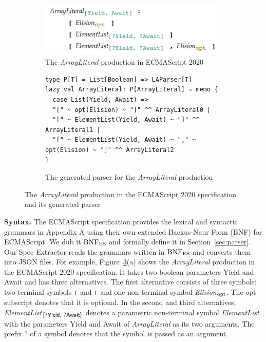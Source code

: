 \begin{figure}
  \centering
  \begin{subfigure}[t]{0.4\textwidth}
    \includegraphics[width=\textwidth]{img/array_literal.png}
    \caption{The \textit{ArrayLiteral} production in ECMAScript 2020}
    \label{fig:array-literal-es}
  \end{subfigure}
  \begin{subfigure}[t]{0.46\textwidth}
    \begin{lstlisting}[style=myScalastyle]
type P[T] = List[Boolean] => LAParser[T]
lazy val ArrayLiteral: P[ArrayLiteral] = memo {
  case List(Yield, Await) =>
  "[" ~ opt(Elision) ~ "]" ^^ ArrayLiteral0 |
  "[" ~ ElementList(Yield, Await) ~ "]" ^^ ArrayLiteral1 |
  "[" ~ ElementList(Yield, Await) ~ "," ~ opt(Elision) ~ "]" ^^ ArrayLiteral2
}
    \end{lstlisting}
    \caption{The generated parser for the \textit{ArrayLiteral} production}
    \label{fig:array-literal-parser}
  \end{subfigure}
  \caption{The \textit{ArrayLiteral} production in the ECMAScript 2020 specification and its generated parser}
  \label{fig:array-literal}
\end{figure}

\smallskip

\textbf{Syntax.} The ECMAScript specification provides the lexical and
syntactic grammars in Appendix A using their own extended Backus-Naur
Form (BNF) for ECMAScript.  We dub it \( \text{BNF}_{\text{ES}} \) and formally define
it in Section~\ref{sec:parser}.  Our {\sf Spec Extractor} reads the
grammars written in \( \text{BNF}_{\text{ES}} \) and converts them into JSON files.
For example, Figure~\ref{fig:array-literal}(a) shows the
\textit{ArrayLiteral} production in the ECMAScript 2020
specification.  It takes two boolean parameters \textsf{Yield} and
\textsf{Await} and has three alternatives.  The first alternative
consists of three symbols: two terminal symbols \( \texttt{\footnotesize[} \) and
\( \texttt{\footnotesize]} \) and one non-terminal symbol \textit{Elision}$_{\mbox{\footnotesize opt}}$.
The {\small opt} subscript denotes that it is optional.  In the second
and third alternatives, \textit{ElementList}$_{\mbox{\footnotesize\sf [?Yield, ?Await]}}$
denotes a parametric non-terminal symbol \textit{ElementList}
with the parameters \textsf{Yield} and \textsf{Await} of
\textit{ArrayLiteral} as its two arguments. The prefix \textsf{\small ?}
of a symbol denotes that the symbol is passed as an argument.

